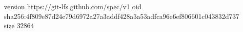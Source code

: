 version https://git-lfs.github.com/spec/v1
oid sha256:4f809e87d24c79d6972a27a3addf428a3a53adfca96e6ef806601c043832d737
size 32864
